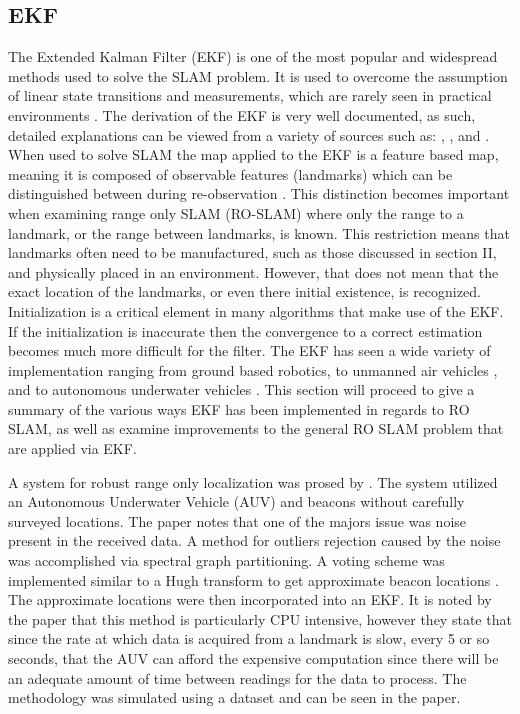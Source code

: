 \documentclass[conference]{IEEEtran}
\begin{document}
\subsection{EKF}
The Extended Kalman Filter (EKF) is one of the most popular and widespread methods used to solve the SLAM problem. It is used to overcome the assumption of linear state transitions and measurements, which are rarely seen in practical environments \cite{Thrun2002}. The derivation of the EKF is very well documented, as such, detailed explanations can be viewed from a variety of sources such as: \cite{Thrun2002}, \cite{Ribeiro2004}, and \cite{Haykin2001}. When used to solve SLAM the map applied to the EKF is a feature based map, meaning it is composed of observable features (landmarks) which can be distinguished between during re-observation \cite{Thrun2002}. This distinction becomes important when examining range only SLAM (RO-SLAM) where only the range to a landmark, or the range between landmarks, is known. This restriction means that landmarks often need to be manufactured, such as those discussed in section II, and physically placed in an environment. However, that does not mean that the exact location of the landmarks, or even there initial existence, is recognized. Initialization is a critical element in many algorithms that make use of the EKF. If the initialization is inaccurate then the convergence to a correct estimation becomes much more difficult for the filter. The EKF has seen a wide variety of implementation ranging from ground based robotics\cite{Djugash2008}, to unmanned air vehicles \cite{Fabresse2016}, and to autonomous underwater vehicles \cite{Olson2006}. This section will proceed to give a summary of the various ways EKF has been implemented in regards to RO SLAM, as well as examine improvements to the general RO SLAM problem that are applied via EKF.

A system for robust range only localization was prosed by \cite{Olson2006}. The system utilized an Autonomous Underwater Vehicle (AUV) and beacons without carefully surveyed locations. The paper notes that one of the majors issue was noise present in the received data. A method for outliers rejection caused by the noise was accomplished via spectral graph partitioning. A voting scheme was implemented similar to a Hugh transform to get approximate beacon locations \cite{Hough1959}. The approximate locations were then incorporated into an EKF. It is noted by the paper that this method is particularly CPU intensive, however they state that since the rate at which data is acquired from a landmark is slow, every 5 or so seconds, that the AUV can afford the expensive computation since there will be an adequate amount of time between readings for the data to process. The methodology was simulated using a dataset and can be seen in the paper.
\end{document}
